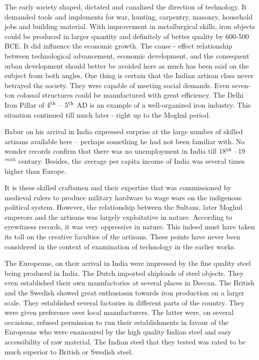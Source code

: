 The early society shaped, dictated and canalized the direction of technology. It demanded tools and implements for war, hunting, carpentry, masonry, household jobs and building material. With improvement in metallurgical skills, iron objects could be produced in larger quantity and definitely of better quality by 600-500 BCE. It did influence the economic growth. The cause - effect relationship between technological advancement, economic development, and the consequent urban development should better be avoided here as much has been said on the subject from both angles. One thing is certain that the Indian artisan class never betrayed the society. They were capable of meeting social demands. Even seven-ton colossal structures could be manufactured with great efficiency. The Delhi Iron Pillar of 4$^{\rm th}$ – 5$^{\rm th}$ AD is an example of a well-organized iron industry. This situation continued till much later - right up to the Moghul period.

Babur on his arrival in India expressed surprise at the large number of skilled artisans available here – perhaps something he had not been familiar with. No wonder records confirm that there was no unemployment in India till 18$^{\rm th}$ –19$^{rm th}$ century. Besides, the average per capita income of India was several times higher than Europe.

It is these skilled craftsmen and their expertise that was commissioned by medieval rulers to produce military hardware to wage wars on the indigenous political system. However, the relationship between the Sultans, later Moghul emperors and the artisans was largely exploitative in nature. According to eyewitness records, it was very oppressive in nature. This indeed must have taken its toll on the creative faculties of the artisans. These points have never been considered in the context of examination of technology in the earlier works.

The Europeans, on their arrival in India were impressed by the fine quality steel being produced in India. The Dutch imported shiploads of steel objects. They even established their own manufactories at several places in Deccan. The British and the Swedish showed great enthusiasm towards iron production on a larger scale. They established several factories in different parts of the country. They were given preference over local manufacturers. The latter were, on several occasions, refused permission to run their establishments in favour of the Europeans who were enamoured by the high quality Indian steel and easy accessibility of raw material. The Indian steel that they tested was rated to be much superior to British or Swedish steel.


